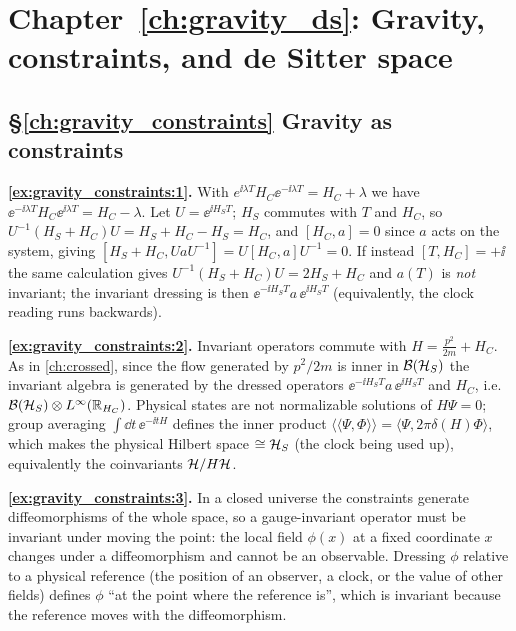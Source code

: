 {\section*{Chapter~\ref{ch:gravity_ds}: Gravity, constraints, and de Sitter space}

\subsection*{\S\ref{ch:gravity_constraints} Gravity as constraints}
\textbf{\ref{ex:gravity_constraints:1}.} With $e^{\ii\lambda T}H_C\ee^{-\ii\lambda T}=H_C+\lambda$ we have $\ee^{-\ii\lambda T}H_C\ee^{\ii\lambda T}=H_C-\lambda$. Let $U=\ee^{\ii H_ST}$; $H_S$ commutes with $T$ and $H_C$, so $U^{-1}(H_S+H_C)U=H_S+H_C-H_S=H_C$, and $[H_C,a]=0$ since $a$ acts on the system, giving $[H_S+H_C,UaU^{-1}]=U[H_C,a]U^{-1}=0$. If instead $[T,H_C]=+\ii$ the same calculation gives $U^{-1}(H_S+H_C)U=2H_S+H_C$ and $a(T)$ is \emph{not} invariant; the invariant dressing is then $\ee^{-\ii H_ST}a\,\ee^{\ii H_ST}$ (equivalently, the clock reading runs backwards).\par
\textbf{\ref{ex:gravity_constraints:2}.} Invariant operators commute with $H=\frac{p^2}{2m}+H_C$. As in \cref{ch:crossed}, since the flow generated by $p^2/2m$ is inner in $\mathcal{B}(\mathcal{H}_S)$ the invariant algebra is generated by the dressed operators $\ee^{-\ii H_ST}a\,\ee^{\ii H_ST}$ and $H_C$, i.e.\ $\mathcal{B}(\mathcal{H}_S)\otimes L^\infty(\mathbb{R}_{H_C})$. Physical states are not normalizable solutions of $H\Psi=0$; group averaging $\int\dd t\,\ee^{-\ii tH}$ defines the inner product $\langle\!\langle\Psi,\Phi\rangle\!\rangle=\langle\Psi,2\pi\delta(H)\Phi\rangle$, which makes the physical Hilbert space $\cong\mathcal{H}_S$ (the clock being used up), equivalently the coinvariants $\mathcal{H}/H\mathcal{H}$.\par
\textbf{\ref{ex:gravity_constraints:3}.} In a closed universe the constraints generate diffeomorphisms of the whole space, so a gauge-invariant operator must be invariant under moving the point: the local field $\phi(x)$ at a fixed coordinate $x$ changes under a diffeomorphism and cannot be an observable. Dressing $\phi$ relative to a physical reference (the position of an observer, a clock, or the value of other fields) defines $\phi$ ``at the point where the reference is'', which is invariant because the reference moves with the diffeomorphism.\par

}
